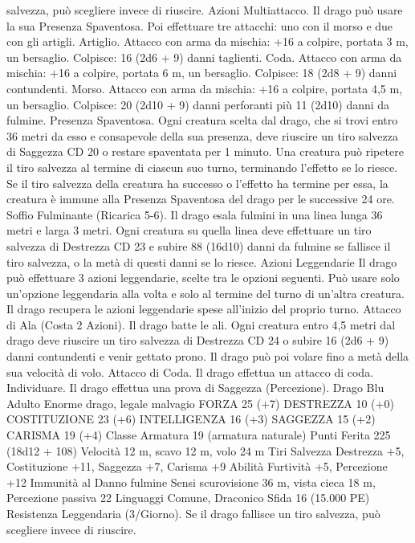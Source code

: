\begin{multicols}{2}
salvezza, può scegliere invece di riuscire.
Azioni
Multiattacco. Il drago può usare la sua Presenza Spaventosa. Poi
effettuare tre attacchi: uno con il morso e due con gli artigli.
Artiglio. Attacco con arma da mischia: +16 a colpire, portata 3
m, un bersaglio.
Colpisce: 16 (2d6 + 9) danni taglienti.
Coda. Attacco con arma da mischia: +16 a colpire, portata 6 m,
un bersaglio.
Colpisce: 18 (2d8 + 9) danni contundenti.
Morso. Attacco con arma da mischia: +16 a colpire, portata 4,5
m, un bersaglio.
Colpisce: 20 (2d10 + 9) danni perforanti più 11 (2d10) danni da
fulmine.
Presenza Spaventosa. Ogni creatura scelta dal drago, che si trovi
entro 36 metri da esso e consapevole della sua presenza, deve
riuscire un tiro salvezza di Saggezza CD 20 o restare spaventata
per 1 minuto. Una creatura può ripetere il tiro salvezza al termine
di ciascun suo turno, terminando l’effetto se lo riesce. Se il tiro
salvezza della creatura ha successo o l’effetto ha termine per
essa, la creatura è immune alla Presenza Spaventosa del drago
per le successive 24 ore.
Soffio Fulminante (Ricarica 5-6). Il drago esala fulmini in una
linea lunga 36 metri e larga 3 metri. Ogni creatura su quella linea
deve effettuare un tiro salvezza di Destrezza CD 23 e subire 88
(16d10) danni da fulmine se fallisce il tiro salvezza, o la metà di
questi danni se lo riesce.
Azioni Leggendarie
Il drago può effettuare 3 azioni leggendarie, scelte tra le opzioni
seguenti. Può usare solo un’opzione leggendaria alla volta e solo
al termine del turno di un’altra creatura. Il drago recupera le
azioni leggendarie spese all’inizio del proprio turno.
Attacco di Ala (Costa 2 Azioni). Il drago batte le ali. Ogni
creatura entro 4,5 metri dal drago deve riuscire un tiro salvezza
di Destrezza CD 24 o subire 16 (2d6 + 9) danni contundenti e
venir gettato prono. Il drago può poi volare fino a metà della sua
velocità di volo.
Attacco di Coda. Il drago effettua un attacco di coda.
Individuare. Il drago effettua una prova di Saggezza
(Percezione).
Drago Blu Adulto
Enorme drago, legale malvagio
FORZA 25 (+7)
DESTREZZA 10 (+0)
COSTITUZIONE 23 (+6)
INTELLIGENZA 16 (+3)
SAGGEZZA 15 (+2)
CARISMA 19 (+4)
Classe Armatura 19 (armatura naturale)
Punti Ferita 225 (18d12 + 108)
Velocità 12 m, scavo 12 m, volo 24 m
Tiri Salvezza Destrezza +5, Costituzione +11, Saggezza +7,
Carisma +9
Abilità Furtività +5, Percezione +12
Immunità al Danno fulmine
Sensi scurovisione 36 m, vista cieca 18 m, Percezione passiva 22
Linguaggi Comune, Draconico
Sfida 16 (15.000 PE)
Resistenza Leggendaria (3/Giorno). Se il drago fallisce un tiro
salvezza, può scegliere invece di riuscire.

\end{multicols}
